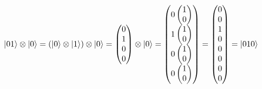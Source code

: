 \documentclass{article}
\DeclarePairedDelimiter\ket{\lvert}{\rangle}
\begin{document}
\(
\ket{01} \otimes \ket{0} = 
\left( \ket{0} \otimes \ket{1} \right) \otimes \ket{0} = 
\begin{pmatrix} 0 \\ 1 \\ 0 \\ 0 \end{pmatrix} \otimes \ket{0} =
\begin{pmatrix} 0 \begin{pmatrix} 1 \\ 0 \end{pmatrix} \\ 1 \begin{pmatrix} 1 \\ 0 \end{pmatrix} \\ 0 \begin{pmatrix} 1 \\ 0 \end{pmatrix} \\ 0 \begin{pmatrix} 1 \\ 0 \end{pmatrix} \end{pmatrix} =
\begin{pmatrix} 0 \\ 0 \\ 1 \\ 0 \\ 0 \\ 0 \\ 0 \\ 0 \end{pmatrix} = 
\ket{010}
\)
\end{document}
